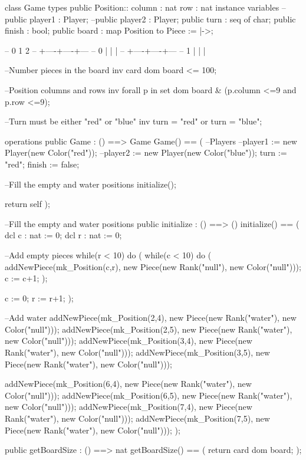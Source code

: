 \begin{vdm_al}
class Game
 types
  public Position:: column : nat row : nat
 instance variables
  --public player1 : Player;
  --public player2 : Player;
  public turn : seq of char;
  public finish : bool;
  public board : map Position to Piece := {|->};
  
  --       0    1    2
  --     +----+----+---
  --   0 |    |    |   
  --     +----+----+---
  --   1 |    |    |   
  
 --Number pieces in the board
 inv card dom board <= 100;
 
 --Position columns and rows
 inv forall p in set dom board & (p.column <=9 and p.row <=9);
 
 --Turn must be either "red" or "blue"
 inv turn = "red" or turn = "blue";
 
 operations
  public Game : () ==> Game
   Game() ==
   (
    --Players
    --player1 := new Player(new Color("red"));
    --player2 := new Player(new Color("blue"));
    turn := "red";
    finish := false;
    
    --Fill the empty and water positions
    initialize();
    
    return self
   );
   
  --Fill the empty and water positions
  public initialize : () ==> ()
   initialize() ==
   (
    dcl c : nat := 0;
    dcl r : nat := 0;
    
    --Add empty pieces
    while(r < 10) do
    (
     while(c < 10) do
     (
      addNewPiece(mk_Position(c,r), new Piece(new Rank("null"), new Color("null")));
      c := c+1;
     );
     
     c := 0;
     r := r+1;
    );
    
    --Add water
    addNewPiece(mk_Position(2,4), new Piece(new Rank("water"), new Color("null")));
    addNewPiece(mk_Position(2,5), new Piece(new Rank("water"), new Color("null")));
    addNewPiece(mk_Position(3,4), new Piece(new Rank("water"), new Color("null")));
    addNewPiece(mk_Position(3,5), new Piece(new Rank("water"), new Color("null")));
    
    addNewPiece(mk_Position(6,4), new Piece(new Rank("water"), new Color("null")));
    addNewPiece(mk_Position(6,5), new Piece(new Rank("water"), new Color("null")));
    addNewPiece(mk_Position(7,4), new Piece(new Rank("water"), new Color("null")));
    addNewPiece(mk_Position(7,5), new Piece(new Rank("water"), new Color("null")));
   );
   
  public getBoardSize : () ==> nat
   getBoardSize() ==
   (
    return card dom board;
   );
   

\end{vdm_al}
